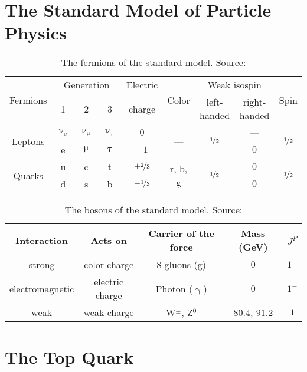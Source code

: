 \section{The Standard Model of Particle Physics}
\begin{table}[h]
\caption[Fermions of the SM]{The fermions of the standard model. Source: \cite{povh}}
\label{tab:ch_1_sm_particles}
\begin{tabular}{ccccccccc}
\toprule
\multirow{2}{*}{Fermions} & \multicolumn{3}{c}{Generation} & {Electric} & \multirow{2}{*}{Color} & \multicolumn{2}{c}{Weak isospin} & \multirow{2}{*}{Spin}\\
& 1 & 2 & 3 & {charge} & & left-handed & right-handed & \\
\midrule
\multirow{2}{*}{Leptons} & $\upnu_\textrm{e}$ & $\upnu_\upmu$ & $\upnu_\uptau$ & {$0$} & \multirow{2}{*}{---} & \multirow{2}{*}{$\nicefrac{1}{2}$} & --- & \multirow{2}{*}{$\nicefrac{1}{2}$}\\
& e & $\upmu$ & $\uptau$ & {$-1$} & & & {$0$} &\\
\midrule
\multirow{2}{*}{Quarks} & u & c & t & $+\nicefrac{2}{3}$ & \multirow{2}{*}{r, b, g} & \multirow{2}{*}{$\nicefrac{1}{2}$} & {$0$} & \multirow{2}{*}{$\nicefrac{1}{2}$}\\
& d & s & b & $-\nicefrac{1}{3}$ & & & {$0$} & \\
\bottomrule
\end{tabular}
\end{table}

\begin{table}[h]
\caption[Bosons described by the SM]{The bosons of the standard model. Source: \cite{povh}}
\label{tab:ch_1_sm_bosons}
\begin{tabular}{ccccc}
\toprule
Interaction & Acts on & Carrier of the force & Mass (GeV) & {$J^P$}\\
\midrule
strong & color charge & 8 gluons (g) & {$0$} & {$1^-$}\\
electromagnetic & electric charge & Photon ($\upgamma$) & {$0$} & {$1^-$}\\
weak & weak charge & W$^{\pm}$, Z$^0$ & {$80.4$, $91.2$} & {$1$}\\
\bottomrule
\end{tabular}
\end{table}

\section{The Top Quark}
